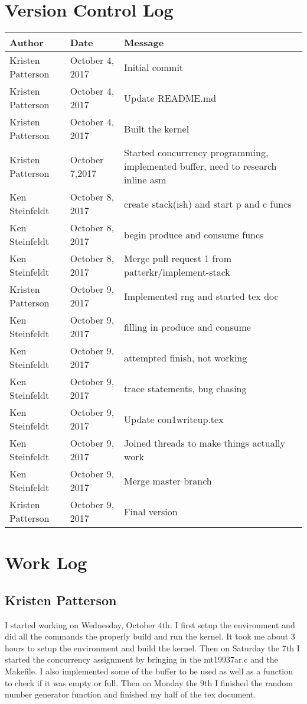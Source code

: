 \documentclass[10pt,letterpaper,onecolumn,draftclsnofoot]{IEEEtran}
\begin{document}
\section{Version Control Log}

\begin{center}
	\begin{tabular}{|l|l|l|}
		\hline
		\textbf{Author} & \textbf{Date} & \textbf{Message} \\ \hline
		Kristen Patterson & October 4, 2017 & Initial commit \\ \hline
		Kristen Patterson & October 4, 2017 & Update README.md \\ \hline
		Kristen Patterson & October 4, 2017 & Built the kernel \\ \hline
		Kristen Patterson & October 7,2017 & Started concurrency programming, implemented buffer, need to research inline asm \\ \hline
		Ken Steinfeldt & October 8, 2017 & create stack(ish) and start p and c funcs \\ \hline
		Ken Steinfeldt & October 8, 2017 & begin produce and consume funcs \\ \hline
		Ken Steinfeldt & October 8, 2017 & Merge pull request 1 from patterkr/implement-stack \\ \hline
		Kristen Patterson & October 9, 2017 & Implemented rng and started tex doc \\ \hline
		Ken Steinfeldt & October 9, 2017 & filling in produce and consume \\ \hline
		Ken Steinfeldt & October 9, 2017 & attempted finish, not working \\ \hline
		Ken Steinfeldt & October 9, 2017 & trace statements, bug chasing \\ \hline
		Ken Steinfeldt & October 9, 2017 & Update con1writeup.tex \\ \hline
		Ken Steinfeldt & October 9, 2017 & Joined threads to make things actually work \\ \hline
		Ken Steinfeldt & October 9, 2017 & Merge master branch \\ \hline
		Kristen Patterson & October 9, 2017 & Final version \\ \hline
	\end{tabular}
\end{center}

\section{Work Log}
\subsection{Kristen Patterson}
I started working on Wednesday, October 4th. I first setup the environment and 
did all the commands the properly build and run the kernel. It took me about 
3 hours to setup the environment and build the kernel. Then on Saturday the 7th
I started the concurrency assignment by bringing in the mt19937ar.c and the 
Makefile. I also implemented some of the buffer to be used as well as a 
function to check if it was empty or full. Then on Monday the 9th I finished 
the random number generator function and finished my half of the tex document.
\end{document}
